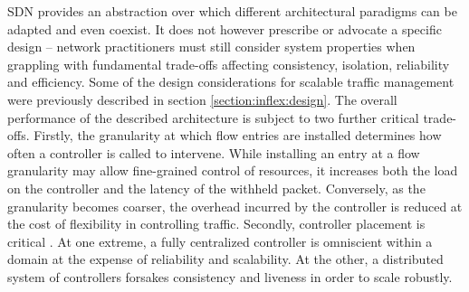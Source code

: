 \ac{SDN} provides an abstraction over which different architectural paradigms can be adapted and even coexist.
It does not however prescribe or advocate a specific design -- network practitioners must still consider system properties when grappling with fundamental trade-offs affecting consistency, isolation, reliability and efficiency.
Some of the design considerations for scalable traffic management were previously described in section \ref{section:inflex:design}.
The overall performance of the described architecture is subject to two further critical trade-offs.
Firstly, the granularity at which flow entries are installed determines how often a controller is called to intervene.
While installing an entry at a flow granularity may allow fine-grained control of resources, it increases both the load on the controller and the latency of the withheld packet.
Conversely, as the granularity becomes coarser, the overhead incurred by the controller is reduced at the cost of flexibility in controlling traffic.
Secondly, controller placement is critical \cite{Heller:2012:CPP:2342441.2342444}.
At one extreme, a fully centralized controller is omniscient within a domain at the expense of reliability and scalability.
At the other, a distributed system of controllers forsakes consistency and liveness in order to scale robustly.
